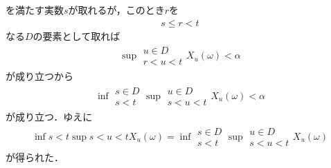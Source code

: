 \begin{sketch}
\begin{description}
				を満たす実数$s$が取れるが，このとき$r$を
				\begin{align}
					s \leq r < t
				\end{align}
				なる$D$の要素として取れば
				\begin{align}
					\sup{\substack{u \in D \\ r < u < t}}{X_u(\omega)} < \alpha
				\end{align}
				が成り立つから
				\begin{align}
					\inf{\substack{s \in D \\ s < t}}{\sup{\substack{u \in D \\ s < u < t}}{X_u(\omega)}} < \alpha
				\end{align}
				が成り立つ．ゆえに
				\begin{align}
					\inf{s < t}{\sup{s < u < t}{X_u(\omega)}} =
					\inf{\substack{s \in D \\ s < t}}{\sup{\substack{u \in D \\ s < u < t}}{X_u(\omega)}}
				\end{align}
				が得られた．
				\QED
		\end{description}
	\end{sketch}